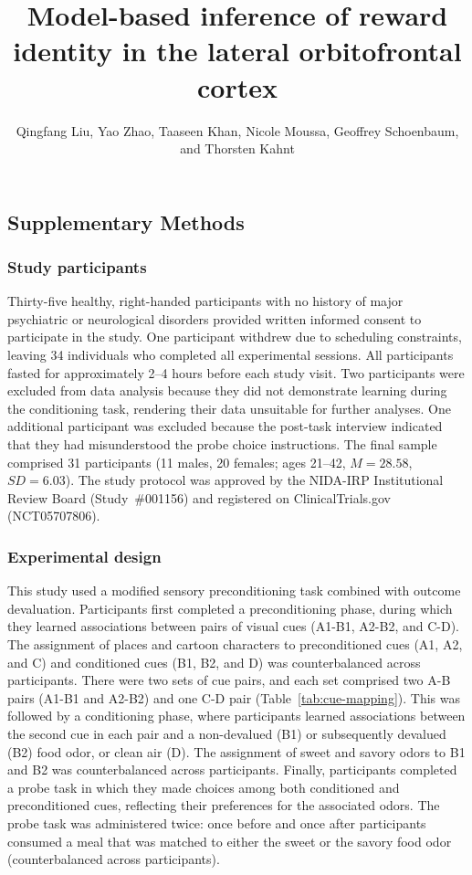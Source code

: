 \documentclass[9pt,twoside,lineno]{pnas-new}
\title{Model-based inference of reward identity in the lateral orbitofrontal cortex}
\author{Qingfang Liu, Yao Zhao, Taaseen Khan, Nicole Moussa, Geoffrey Schoenbaum, and Thorsten Kahnt}
\begin{document}
\maketitle
\SItext

\subsection*{Supplementary Methods}

\subsubsection*{Study participants}

Thirty-five healthy, right-handed participants with no history of major psychiatric or neurological disorders provided written informed consent to participate in the study. One participant withdrew due to scheduling constraints, leaving 34 individuals who completed all experimental sessions. All participants fasted for approximately 2–4 hours before each study visit. Two participants were excluded from data analysis because they did not demonstrate learning during the conditioning task, rendering their data unsuitable for further analyses. One additional participant was excluded because the post-task interview indicated that they had misunderstood the probe choice instructions. The final sample comprised 31 participants (11 males, 20 females; ages 21–42, $M = 28.58$, $SD = 6.03$). The study protocol was approved by the NIDA-IRP Institutional Review Board (Study~\#001156) and registered on ClinicalTrials.gov (NCT05707806).

\subsubsection*{Experimental design}

This study used a modified sensory preconditioning task combined with outcome devaluation. Participants first completed a preconditioning phase, during which they learned associations between pairs of visual cues (A1-B1, A2-B2, and C-D). The assignment of places and cartoon characters to preconditioned cues (A1, A2, and C) and conditioned cues (B1, B2, and D) was counterbalanced across participants. There were two sets of cue pairs, and each set comprised two A-B pairs (A1-B1 and A2-B2) and one C-D pair (Table~\ref{tab:cue-mapping}). This was followed by a conditioning phase, where participants learned associations between the second cue in each pair and a non-devalued (B1) or subsequently devalued (B2) food odor, or clean air (D). The assignment of sweet and savory odors to B1 and B2 was counterbalanced across participants. Finally, participants completed a probe task in which they made choices among both conditioned and preconditioned cues, reflecting their preferences for the associated odors. The probe task was administered twice: once before and once after participants consumed a meal that was matched to either the sweet or the savory food odor (counterbalanced across participants).
\end{document}
